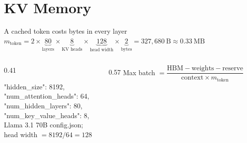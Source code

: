 \documentclass[aspectratio=169, 12pt]{beamer}
\begin{document}
\section{KV Memory}

\begin{frame}{A cached token costs bytes in every layer}
  \centering
  {\normalsize $m_{\text{token}} = 2 \times \underbrace{80}_{\text{layers}} \times \underbrace{8}_{\text{KV heads}} \times \underbrace{128}_{\text{head width}} \times \underbrace{2}_{\text{bytes}} = 327{,}680\ \text{B} \approx 0.33\ \text{MB}$}\\[0.6cm]
  \begin{columns}[T]
  \begin{column}{0.41\textwidth}
  \raggedright\footnotesize\ttfamily
  "hidden\_size": 8192,\\
  "num\_attention\_heads": 64,\\
  "num\_hidden\_layers": 80,\\
  "num\_key\_value\_heads": 8,\\[0.08cm]
  \sffamily\textcolor{midgray}{Llama 3.1 70B config.json;\\ head width $= 8192 / 64 = 128$}
  \end{column}
  \begin{column}{0.57\textwidth}
  \centering
  {\small Max batch $= \dfrac{\text{HBM} - \text{weights} - \text{reserve}}{\text{context} \times m_{\text{token}}}$}\\[0.05cm]
  \end{column}
  \end{columns}
\end{frame}
\end{document}
